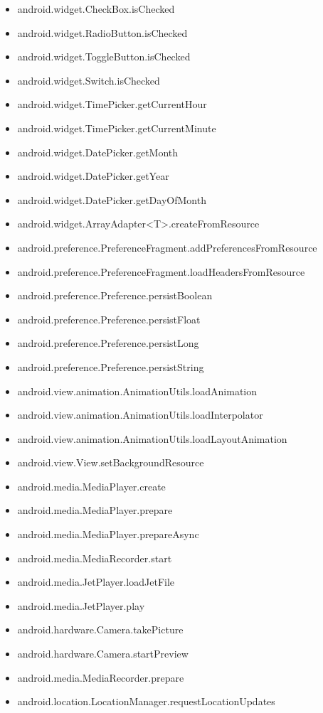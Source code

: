 \documentclass{sig-alternate}
\begin{document}
\begin{itemize}
\item android.widget.CheckBox.isChecked
\item android.widget.RadioButton.isChecked
\item android.widget.ToggleButton.isChecked
\item android.widget.Switch.isChecked
\item android.widget.TimePicker.getCurrentHour
\item android.widget.TimePicker.getCurrentMinute
\item android.widget.DatePicker.getMonth
\item android.widget.DatePicker.getYear
\item android.widget.DatePicker.getDayOfMonth
\item android.widget.ArrayAdapter<T>.createFromResource
\item android.preference.PreferenceFragment.addPreferencesFromResource
\item android.preference.PreferenceFragment.loadHeadersFromResource
\item android.preference.Preference.persistBoolean
\item android.preference.Preference.persistFloat
\item android.preference.Preference.persistLong
\item android.preference.Preference.persistString
\item android.view.animation.AnimationUtils.loadAnimation
\item android.view.animation.AnimationUtils.loadInterpolator
\item android.view.animation.AnimationUtils.loadLayoutAnimation
\item android.view.View.setBackgroundResource
\item android.media.MediaPlayer.create
\item android.media.MediaPlayer.prepare
\item android.media.MediaPlayer.prepareAsync
\item android.media.MediaRecorder.start
\item android.media.JetPlayer.loadJetFile
\item android.media.JetPlayer.play
\item android.hardware.Camera.takePicture
\item android.hardware.Camera.startPreview
\item android.media.MediaRecorder.prepare
\item android.location.LocationManager.requestLocationUpdates

\end{itemize}
\end{document}

